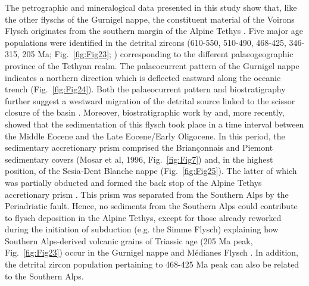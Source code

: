 \documentclass[twoside]{article}
\begin{document}
The petrographic and mineralogical data presented in this study show that, like the other flyschs of the Gurnigel nappe, the constituent material of the Voirons Flysch originates from the southern margin of the Alpine Tethys \citep{Butler2011}. Five major age populations were identified in the detrital zircons (610-550, 510-490, 468-425, 346-315, 205 Ma; Fig.~\ref{fig:Fig23}; \citealp{Butler2011}) corresponding to the different palaeogeographic province of the Tethyan realm. The palaeocurrent pattern of the Gurnigel nappe indicates a northern direction which is deflected eastward along the oceanic trench \citep{Caron1980,Winkler1984,Wildi1985} (Fig.~\ref{fig:Fig24}). Both the palaeocurrent pattern and biostratigraphy further suggest a westward migration of the detrital source linked to the scissor closure of the basin \citep{Winkler1984}. Moreover, biostratigraphic work by \citep{Ujetz1996} and, more recently, \citep{Ospina-Ostios2013} showed that the sedimentation of this flysch took place in a time interval between the Middle Eocene and the Late Eocene/Early Oligocene. In this period, the sedimentary accretionary prism comprised the Briançonnais and Piemont sedimentary covers (Mosar et al, 1996, Fig.~\ref{fig:Fig7}) and, in the highest position, of the Sesia-Dent Blanche nappe \citep{Schmid1996,Handy2010} (Fig.~\ref{fig:Fig25}). The latter of which was partially obducted and formed the back stop of the Alpine Tethys accretionary prism \citep{Stampfli1998,Manzotti2014}. This prism was separated from the Southern Alps by the Periadriatic fault. Hence, no sediments from the Southern Alps could contribute to flysch deposition in the Alpine Tethys, except for those already reworked during the initiation of subduction (e.g. the Simme Flysch) explaining how Southern Alps-derived volcanic grains of Triassic age (205 Ma peak, Fig.~\ref{fig:Fig23}) occur in the Gurnigel nappe \citep{Butler2011} and Médianes Flysch \citep{Beltran-Trivino2013}. In addition, the detrital zircon population pertaining to 468-425 Ma peak can also be related to the Southern Alps.\par
\medskip
\end{document}
